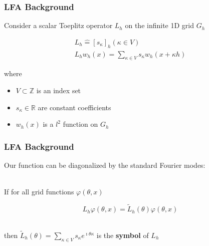 \documentclass{beamer}
\begin{document}
\begin{frame}
\begin{center}
\frametitle{LFA Background}

Consider a scalar Toeplitz operator $L_h$ on the infinite 1D grid $G_h$

\begin{equation}
\begin{gathered}
L_h \mathrel{\hat{=}} \left[ s_\kappa \right]_h \left( \kappa \in V \right)\\
L_h w_h \left( x \right) = \sum_{\kappa \in V} s_\kappa w_h \left( x + \kappa h \right)
\end{gathered}
\end{equation}

\begin{flushleft}
where
\end{flushleft}

\begin{itemize}

\item $V \subset \mathbb{Z}$ is an index set

\item $s_\kappa \in \mathbb{R}$ are constant coefficients

\item $w_h \left( x \right)$ is a $l^2$ function on $G_h$

\end{itemize}

\end{center}
\end{frame}


\begin{frame}
\begin{center}
\frametitle{LFA Background}

Our function can be diagonalized by the standard Fourier modes:

~\\

If for all grid functions $\varphi \left( \theta, x \right)$

\begin{equation}
L_h \varphi \left( \theta, x \right) = \tilde{L}_h \left( \theta \right) \varphi \left( \theta, x \right)
\end{equation}

~\\

then $\tilde{L}_h \left( \theta \right) = \sum_{\kappa \in V} s_\kappa e^{\imath \theta \kappa}$ is the {\bf symbol} of $L_h$\\

\end{center}
\end{frame}
\end{document}
